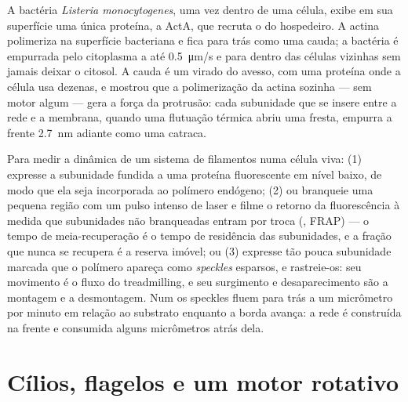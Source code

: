 \begin{example}\label{ex:b3:cytoskeleton-motility:listeria}
A bactéria \emph{Listeria monocytogenes}, uma vez dentro de uma célula,
exibe em sua superfície uma única proteína, a ActA, que recruta o
 do hospedeiro. A actina polimeriza na superfície
bacteriana e fica para trás como uma cauda; a bactéria é empurrada pelo
citoplasma a até \qty{0.5}{\micro m/s} e para dentro das células
vizinhas sem jamais deixar o citosol. A cauda é um  virado
do avesso, com uma proteína onde a célula usa dezenas, e mostrou que a
polimerização da actina sozinha --- sem motor algum --- gera a força da
protrusão: cada subunidade que se insere entre a rede e a membrana,
quando uma flutuação térmica abriu uma fresta, empurra a frente
\qty{2.7}{nm} adiante como uma catraca.
\end{example}

\begin{method}\label{met:b3:cytoskeleton-motility:frap}
Para medir a dinâmica de um sistema de filamentos numa célula viva: (1)
expresse a subunidade fundida a uma proteína fluorescente em nível
baixo, de modo que ela seja incorporada ao polímero endógeno; (2) ou
branqueie uma pequena região com um pulso intenso de laser e filme o
retorno da fluorescência à medida que subunidades não branqueadas
entram por troca (\emph{}, FRAP) --- o tempo de meia-recuperação é o tempo de
residência das subunidades, e a fração que nunca se recupera é a
reserva imóvel; ou (3) expresse tão pouca subunidade marcada que o
polímero apareça como \emph{speckles} esparsos, e rastreie-os: seu
movimento é o fluxo do treadmilling, e seu surgimento e desaparecimento
são a montagem e a desmontagem. Num  os speckles fluem para
trás a um micrômetro por minuto em relação ao substrato enquanto a
borda avança: a rede é construída na frente e consumida alguns
micrômetros atrás dela.
\end{method}

\section{Cílios, flagelos e um motor rotativo}

